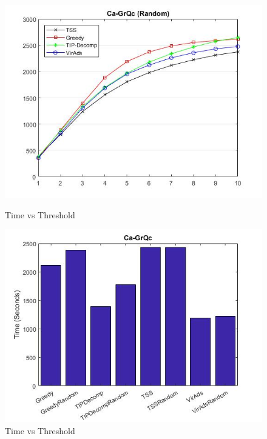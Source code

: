 \begin{figure}[h!]
\begin{minipage}[t]{0.50\textwidth}
\includegraphics[width=\linewidth,keepaspectratio=true]{images/ca-grqcresultrandom.jpg}
\caption{Time vs Threshold}

\end{minipage}
\begin{minipage}[t]{0.50\textwidth}
\includegraphics[width=\linewidth,keepaspectratio=true]{images/grqctime.jpg}
\caption{Time vs Threshold}
\end{minipage}
\end{figure}


